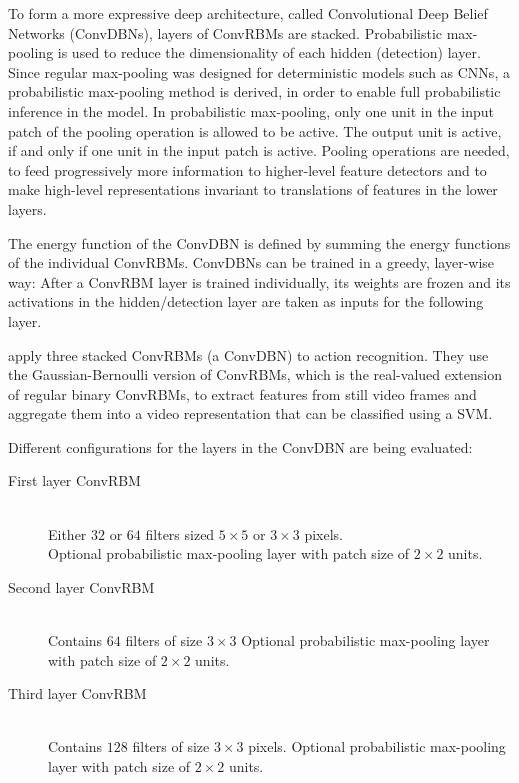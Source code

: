 To form a more expressive deep architecture, called Convolutional Deep Belief Networks (ConvDBNs), layers of ConvRBMs are stacked.
Probabilistic max-pooling is used to reduce the dimensionality of each hidden (detection) layer.
Since regular max-pooling was designed for deterministic models such as CNNs, a probabilistic max-pooling method is derived, in order to enable full probabilistic inference in the model.
In probabilistic max-pooling, only one unit in the input patch of the pooling operation is allowed to be active.
The output unit is active, if and only if one unit in the input patch is active.
Pooling operations are needed, to feed progressively more information to higher-level feature detectors and to make high-level representations invariant to translations of features in the lower layers. \cite{lee_convolutional_2009-1}

The energy function of the ConvDBN is defined by summing the energy functions of the individual ConvRBMs.
ConvDBNs can be trained in a greedy, layer-wise way: After a ConvRBM layer is trained individually, its weights are frozen and its activations in the hidden/detection layer are taken as inputs for the following layer.
\cite{lee_convolutional_2009-1}

\textcite{palasek_action_2016} apply three stacked ConvRBMs (a ConvDBN) to action recognition.
They use the Gaussian-Bernoulli version of ConvRBMs, which is the real-valued extension of regular binary ConvRBMs, to extract features from still video frames and aggregate them into a video representation that can be classified using a SVM.

Different configurations for the layers in the ConvDBN are being evaluated:
\begin{description}
    \item[First layer ConvRBM] \hfill \\
        Either $32$ or $64$ filters sized $5 \times 5$ or $3 \times 3$ pixels.\\
        Optional probabilistic max-pooling layer with patch size of $2 \times 2$ units.
    \item[Second layer ConvRBM] \hfill \\
        Contains $64$ filters of size $3 \times 3$
        Optional probabilistic max-pooling layer with patch size of $2 \times 2$ units.
    \item[Third layer ConvRBM] \hfill \\
        Contains $128$ filters of size $3 \times 3$ pixels.
        Optional probabilistic max-pooling layer with patch size of $2 \times 2$ units.
\end{description}


